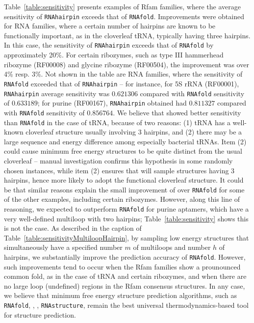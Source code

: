 Table~\ref{table:sensitivity} presents examples of Rfam families, where
the average sensitivity of {\tt RNAhairpin} exceeds that of {\tt RNAfold}.
Improvements were obtained for RNA families, where a certain number of
hairpins are known to be functionally important, as in the cloverleaf
tRNA, typically having three hairpins. In this case, the sensitivity of
{\tt RNAhairpin} exceeds that of {\tt RNAfold} by approximately 20\%.
For certain ribozymes, such as type III hammerhead ribozyme (RF00008)
and glycine ribozyme (RF00504), the improvement was over 4\% resp. 3\%.
Not shown in the table are RNA families, where the sensitivity of
{\tt RNAfold} exceeded that of {\tt RNAhairpin} -- for instance,
for 5S rRNA (RF00001), {\tt RNAhairpin} average sensitivity was
$0.621306$ compared with {\tt RNAfold} sensitivity of $0.633189$;
for purine \rbs (RF00167), {\tt RNAhairpin} obtained had
$0.811327$ compared with {\tt RNAfold} sensitivity of  $0.856764$.
We believe that {\rnahairpin} showed better sensitivity than {\tt RNAfold}
in the case of tRNA, because of two reasons: (1) tRNA has a well-known
cloverleaf structure usually involving 3 hairpins, and (2) there may
be a large sequence and energy difference among especially bacterial
tRNAs. Item (2) could cause minimum free energy structures to be quite
distinct from the usual cloverleaf -- manual investigation
confirms this hypothesis in some randomly chosen instances, while item
(2) ensures that {\rnahairpin} will sample structures having 3 hairpins,
hence more likely to adopt the functional cloverleaf structure.
It could be that similar reasons explain the small improvement of
{\rnahairpin} over {\tt RNAfold} for some of the other examples, including
certain ribozymes. However, along this line of reasoning, we expected
{\rnahairpin} to outperform {\tt RNAfold} for purine \rb aptamers,
which have a very well-defined multiloop with two hairpins;
Table~\ref{table:sensitivity} shows this is not the case.
As described in the caption of
Table~\ref{table:sensitivityMultiloopHairpin}, by sampling low energy
structures that simultaneously have a specified number $m$ of multiloops and
number $h$ of hairpins, we substantially improve the prediction accuracy
of {\tt RNAfold}. However, such improvements tend to occur when the Rfam
families show a prounounced common fold, as in the case of tRNA and certain
ribozymes, and when there are no large loop (undefined) regions in the
Rfam consensus structures.  In any case, we believe that
minimum free energy structure prediction algorithms, such as
{\tt RNAfold}, {\unafold}, {\mfold}, {\tt RNAstructure}, remain
the best universal thermodynamics-based tool for structure prediction.


